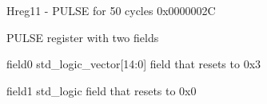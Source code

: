 \documentclass{article}
\begin{document}
\begin{register}{H}{reg11 - PULSE for 50 cycles }{0x0000002C}  \par PULSE register with two fields \regnewline
  \label{reg11}
\regnewline
  \begin{regdesc}\begin{reglist}[field0]
    \item [field0] std{\_}logic{\_}vector[14:0] field that resets to 0x3    \item [field1] std{\_}logic field that resets to 0x0  \end{reglist}\end{regdesc}
\end{register}
\end{document}
